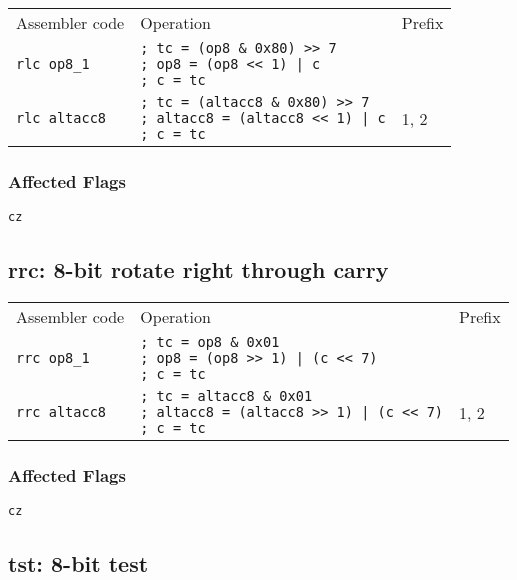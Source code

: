 \documentclass{book}
\begin{document}
\begin{tabular}{l l l}
Assembler code       & Operation                                                                                                   & Prefix \\
\texttt{rlc op8\_1}  & \makecell{\texttt{; tc = (op8  \& 0x80) >> 7}\\\texttt{; op8 = (op8 << 1) | c}\\\texttt{; c = tc}}            & \\
\texttt{rlc altacc8} & \makecell{\texttt{; tc = (altacc8 \& 0x80) >> 7}\\\texttt{; altacc8 = (altacc8 << 1) | c}\\\texttt{; c = tc}} & 1, 2
\end{tabular}

\subsubsection*{Affected Flags}

\texttt{cz}


\subsection{rrc: 8-bit rotate right through carry}

\begin{tabular}{l l l}
Assembler code       & Operation                                                                                                     & Prefix \\
\texttt{rrc op8\_1}  & \makecell{\texttt{; tc = op8  \& 0x01}\\\texttt{; op8 = (op8 >> 1) | (c << 7)}\\\texttt{; c = tc}}            & \\
\texttt{rrc altacc8} & \makecell{\texttt{; tc = altacc8 \& 0x01}\\\texttt{; altacc8 = (altacc8 >> 1) | (c << 7)}\\\texttt{; c = tc}} & 1, 2
\end{tabular}

\subsubsection*{Affected Flags}

\texttt{cz}


\subsection{tst: 8-bit test}
\end{document}
